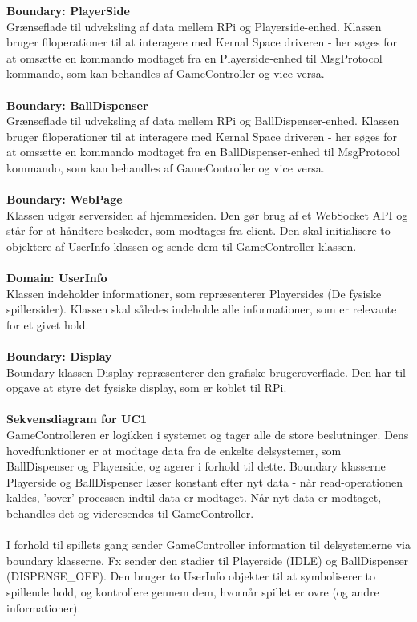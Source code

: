 \documentclass[Rapport/Rapport_main.tex]{subfiles}
\begin{document}
\textbf{Boundary:  PlayerSide}\\
Grænseflade til udveksling af data mellem RPi og Playerside-enhed. Klassen bruger filoperationer til at interagere med Kernal Space driveren - her søges for at omsætte en kommando modtaget fra en Playerside-enhed til MsgProtocol kommando, som kan behandles af GameController og vice versa.\\\\
\textbf{Boundary:  BallDispenser}\\
Grænseflade til udveksling af data mellem RPi og BallDispenser-enhed. Klassen bruger filoperationer til at interagere med Kernal Space driveren - her søges for at omsætte en kommando modtaget fra en BallDispenser-enhed til MsgProtocol kommando, som kan behandles af GameController og vice versa.\\\\
\textbf{Boundary: WebPage}\\
Klassen udgør serversiden af hjemmesiden. Den gør brug af et WebSocket API og står for at håndtere beskeder, som modtages fra client. Den skal initialisere to objektere af UserInfo klassen og sende dem til GameController klassen.\\\\
\textbf{Domain: UserInfo}\\
Klassen indeholder informationer, som repræsenterer Playersides (De fysiske spillersider). Klassen skal således indeholde alle informationer, som er relevante for et givet hold.\\\\
\textbf{Boundary: Display}\\
Boundary klassen Display repræsenterer den grafiske brugeroverflade. Den har til opgave at styre det fysiske display, som er koblet til RPi. \\\\
\textbf{Sekvensdiagram for UC1}\\
GameControlleren er logikken i systemet og tager alle de store beslutninger. Dens hovedfunktioner er at modtage data fra de enkelte delsystemer, som BallDispenser og Playerside, og agerer i forhold til dette. Boundary klasserne Playerside og BallDispenser læser konstant efter nyt data - når read-operationen kaldes, 'sover' processen indtil data er modtaget. Når nyt data er modtaget, behandles det og videresendes til GameController. \\\\
I forhold til spillets gang sender GameController information til delsystemerne via boundary klasserne. Fx sender den stadier til Playerside (IDLE) og BallDispenser (DISPENSE\_OFF). Den bruger to UserInfo objekter til at symboliserer to spillende hold, og kontrollere gennem dem, hvornår spillet er ovre (og andre informationer). \\\\
\end{document}
